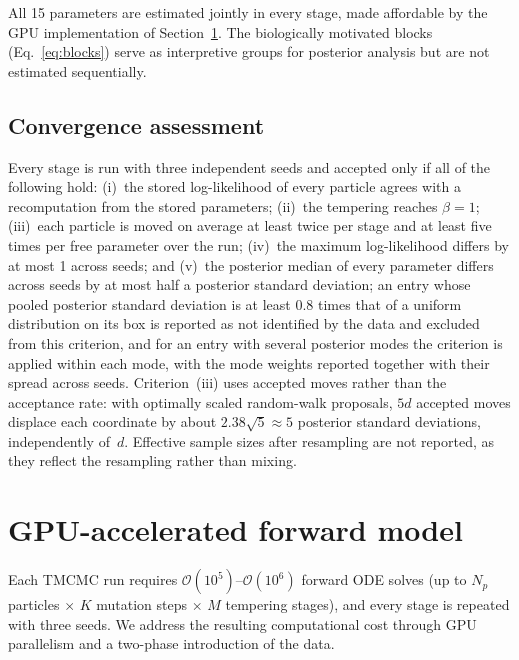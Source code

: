\documentclass[11pt,a4paper]{article}
\begin{document}
All 15 parameters are estimated jointly in every stage, made affordable by the GPU implementation of Section~\ref{sec:gpu}.
The biologically motivated blocks (Eq.~\ref{eq:blocks}) serve as interpretive groups for posterior analysis but are not estimated sequentially.

\subsection{Convergence assessment}
\label{sec:convergence}

Every stage is run with three independent seeds and accepted only if all of the following hold:
(i)~the stored log-likelihood of every particle agrees with a recomputation from the stored parameters;
(ii)~the tempering reaches $\beta=1$;
(iii)~each particle is moved on average at least twice per stage and at least five times per free parameter over the run;
(iv)~the maximum log-likelihood differs by at most 1 across seeds; and
(v)~the posterior median of every parameter differs across seeds by at most half a posterior standard deviation; an entry whose pooled posterior standard deviation is at least 0.8 times that of a uniform distribution on its box is reported as not identified by the data and excluded from this criterion, and for an entry with several posterior modes the criterion is applied within each mode, with the mode weights reported together with their spread across seeds.
Criterion~(iii) uses accepted moves rather than the acceptance rate: with optimally scaled random-walk proposals, $5d$ accepted moves displace each coordinate by about $2.38\sqrt5\approx5$ posterior standard deviations, independently of~$d$.
Effective sample sizes after resampling are not reported, as they reflect the resampling rather than mixing.


\section{GPU-accelerated forward model}
\label{sec:gpu}

Each TMCMC run requires $\mathcal{O}(10^5)$--$\mathcal{O}(10^6)$ forward ODE solves (up to $N_p$ particles $\times$ $K$ mutation steps $\times$ $M$ tempering stages), and every stage is repeated with three seeds.
We address the resulting computational cost through GPU parallelism and a two-phase introduction of the data.
\end{document}
